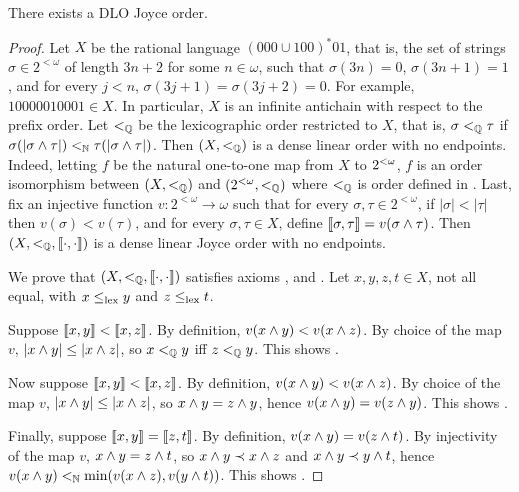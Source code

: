 \begin{theorem}[$\RCA_0$]\label{thm:dlo-joyce-order-exists}
There exists a DLO Joyce order.
\end{theorem}
\begin{proof}
Let $X$ be the rational language $(000 \cup 100)^{*}01$, that is, the set of strings $\sigma \in 2^{<\omega}$ of length $3n+2$ for some $n \in \omega$, such that $\sigma(3n) = 0$, $\sigma(3n+1) = 1$, and for every $j < n$, $\sigma(3j+1) = \sigma(3j+2) = 0$. For example, $10000010001 \in X$. In particular, $X$ is an infinite antichain with respect to the prefix order. Let $<_{\mathbb{Q}}$ be the lexicographic order restricted to $X$, that is, $\sigma <_{\mathbb{Q}} \tau$ if $\sigma(|\sigma \wedge \tau|) <_{\mathbb{N}} \tau(|\sigma \wedge \tau|)$. Then $(X, <_{\mathbb{Q}})$ is a dense linear order with no endpoints. Indeed, letting $f$ be the natural one-to-one map from $X$ to ${2^{<\omega}}$, $f$ is an order isomorphism between $(X, <_{\mathbb{Q}})$ and $({2^{<\omega}}, <_{\mathbb{Q}})$ where $<_{\mathbb{Q}}$ is order defined in .
Last, fix an injective function $v: 2^{<\omega} \to \omega$ such that
for every $\sigma, \tau \in 2^{<\omega}$, if $|\sigma| < |\tau|$ then $v(\sigma) < v(\tau)$,
and for every $\sigma, \tau \in X$, define $\llbracket \sigma , \tau \rrbracket = v(\sigma \wedge \tau)$.
Then $(X, <_{\mathbb{Q}}, \llbracket \cdot , \cdot \rrbracket)$ is a dense linear Joyce order with no endpoints.

We prove that $(X, <_{\mathbb{Q}}, \llbracket \cdot , \cdot \rrbracket)$ satisfies axioms ,  and .
Let $x, y, z, t \in X$, not all equal, with $x \leq_{\mathrm{lex}} y$ and $z \leq_{\mathrm{lex}} t$.

Suppose $\llbracket x , y \rrbracket < \llbracket x , z \rrbracket$. By definition, $v(x \wedge y) < v(x \wedge z)$. By choice of the map $v$,  $|x \wedge y| \leq |x \wedge z|$, so $x <_{\mathbb{Q}} y$ iff $z <_{\mathbb{Q}} y$. This shows .

Now suppose $\llbracket x , y \rrbracket < \llbracket x , z \rrbracket$. By definition, $v(x \wedge y) < v(x \wedge z)$. By choice of the map $v$,  $|x \wedge y| \leq |x \wedge z|$, so $x \wedge y = z \wedge y$, hence $v(x \wedge y) = v(z \wedge y)$. This shows .

Finally, suppose $\llbracket x , y \rrbracket = \llbracket z , t \rrbracket$. By definition, $v(x \wedge y) = v(z \wedge t)$. By injectivity of the map $v$, $x \wedge y = z \wedge t$, so $x \wedge y \prec x \wedge z$ and $x \wedge y \prec y \wedge t$, hence $v(x \wedge y) <_{\mathbb{N}} \min(v(x \wedge z), v(y \wedge t))$. This shows .
\end{proof}

